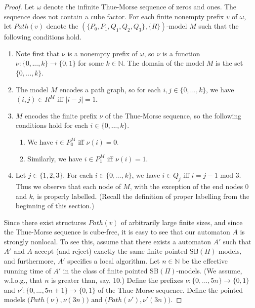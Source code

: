 \documentclass[copyright,creativecommons]{eptcs}
\begin{document}
\begin{proof}
Let $\omega$ denote the infinite Thue-Morse sequence of zeros and ones. The sequence
does not contain a cube factor. For each finite nonempty prefix $v$ of $\omega$,
let $\mathit{Path}(v)$ denote the
$(\{P_0,P_1,Q_1,Q_2,Q_3\},\{R\})$-model $M$ such that the following conditions hold.
\begin{enumerate}
\item
Note first that $\nu$ is a nonempty prefix of $\omega$, so  $\nu$ is a function 
$\nu:\{0,...,k\}\rightarrow\{0,1\}$ for some $k\in\mathbb{N}$.
The domain of the model $M$ is the set $\{0,...,k\}$.
\item
The model $M$ encodes a path graph, so for each $i,j\in\{0,...,k\}$,
we have $(i,j)\in R^M$ iff $| i- j | = 1$.
\item
$M$ encodes the finite prefix $\nu$ of the Thue-Morse sequence, so
the following conditions hold for each $i\in\{0,...,k\}$.
\begin{enumerate}
\item
We have $i\in P^{M}_0$ iff $\nu(i) = 0$.
\item
Similarly, we have $i\in P^{M}_1$ iff $\nu(i) = 1$.
\end{enumerate}
\item
Let $j\in\{1,2,3\}$.
For each $i\in\{0,...,k\}$, we have $i\in Q_j$ iff  $i = j-1$ $\mathrm{mod}$ $3$.
Thus we observe that each node of $M$, with the exception of the end nodes $0$ and $k$, is
properly labelled. (Recall the definition of proper labelling from the beginning of this section.)
\end{enumerate}




Since there exist structures $\mathit{Path}(v)$ of arbitrarily large finite sizes,
and since the Thue-Morse sequence is
cube-free, it is easy to see that our automaton $A$ is strongly nonlocal.
To see this, assume that there exists a automaton $A'$ such that
$A'$ and $A$ accept (and reject) exactly the same finite pointed $\mathrm{SB}(\Pi)$-models,
and furthermore, $A'$ specifies a local algorithm.
Let $n\in\mathbb{N}$ be the effective running time of $A'$ in the class
of finite pointed $\mathrm{SB}(\Pi)$-models. 
(We assume, w.l.o.g., that $n$ is greater than, say, $10$.)
Define the prefixes $\nu:\{0,...,5n\}\rightarrow \{0,1\}$
and $\nu':\{0,...,5n+1\}\rightarrow \{0,1\}$
of the Thue-Morse sequence.
Define the pointed models $\bigl(\mathit{Path}(\nu),\nu(3n)\bigl)$
and $\bigl(\mathit{Path}(\nu'),\nu'(3n)\bigl)$.





\end{proof}
\end{document}
